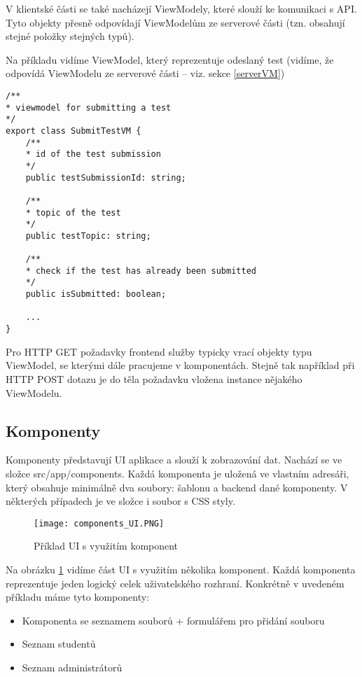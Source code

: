 V klientské části se také nacházejí ViewModely, které slouží ke komunikaci s API. Tyto objekty přesně odpovídají ViewModelům ze serverové části (tzn. obsahují stejné položky stejných typů).

Na příkladu vidíme ViewModel, který reprezentuje odeslaný test (vidíme, že odpovídá ViewModelu ze serverové části -- viz. sekce \ref{serverVM})
\begin{lstlisting}
/**
* viewmodel for submitting a test
*/
export class SubmitTestVM {
	/**
	* id of the test submission
	*/
	public testSubmissionId: string;
	
	/**
	* topic of the test
	*/
	public testTopic: string;
	
	/**
	* check if the test has already been submitted
	*/
	public isSubmitted: boolean;
	
	...
}
\end{lstlisting}

Pro HTTP GET požadavky frontend služby typicky vrací objekty typu ViewModel, se kterými dále pracujeme v komponentách. Stejně tak například při HTTP POST dotazu je do těla požadavku vložena instance nějakého ViewModelu.

\newpage

\subsection{Komponenty}

Komponenty představují UI aplikace a slouží k zobrazování dat. Nachází se ve složce src/app/components. Každá komponenta je uložená ve vlastním adresáři, který obsahuje minimálně dva soubory: šablonu a backend dané komponenty. V některých případech je ve složce i soubor s CSS styly.

\begin{figure}
	\centering
	\texttt{[image: components\_UI.PNG]}
	\caption{Příklad UI s využitím komponent}
	\label{fig:Components}
\end{figure}

Na obrázku \ref{fig:Components} vidíme část UI s využitím několika komponent. Každá komponenta reprezentuje jeden logický celek uživatelského rozhraní. Konkrétně v uvedeném příkladu máme tyto komponenty:

\begin{itemize}
	\item Komponenta se seznamem souborů + formulářem pro přidání souboru
	\item Seznam studentů
	\item Seznam administrátorů
\end{itemize}

